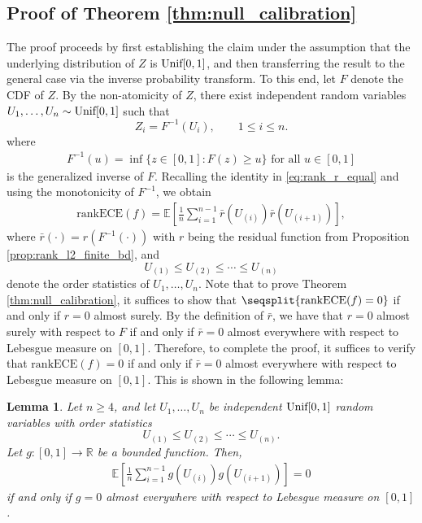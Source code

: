 \documentclass[11pt]{article}
\numberwithin{equation}{section}
\newtheorem{lemma}{Lemma}[section]
\theoremstyle{definition}
\newcommand{\E}{\mathbb{E}}
\newcommand{\R}{\mathbb{R}}
\newcommand{\ra}{\rightarrow}
\newcommand{\rankECE}{\mathrm{rankECE}}
\begin{document}
\subsection{Proof of Theorem \ref{thm:null_calibration}}\label{sec:proofof_thm_null_calibration}
The proof proceeds by first establishing the claim under the assumption that the underlying distribution of $Z$ is $\textnormal{Unif}[0,1]$, and then transferring the result to the general case via the inverse probability transform. To this end, let $F$ denote the CDF of $Z$. By the non-atomicity of $Z$, there exist independent random variables $U_1, \ldots, U_n \sim \textnormal{Unif}[0,1]$ such that
\[
    Z_i = F^{-1}(U_i), \qquad 1 \leq i \leq n.
\]
where
\begin{align*}
    F^{-1}(u) = \inf\{z\in[0,1]: F(z)\geq u\}\text{ for all }u\in [0,1]
\end{align*}
is the generalized inverse of $F$. Recalling the identity in \eqref{eq:rank_r_equal} and using the monotonicity of $F^{-1}$, we obtain
\begin{align}\label{eq:rank_uniform}
    \rankECE(f)
    =
    \E\left[\frac{1}{n}\sum_{i=1}^{n-1}\bar r(U_{(i)})\bar r(U_{(i+1)})\right],
\end{align}
where $\bar r(\cdot) = r(F^{-1}(\cdot))$ with $r$ being the residual function from Proposition \ref{prop:rank_l2_finite_bd}, and
\[
    U_{(1)} \leq U_{(2)} \leq \cdots \leq U_{(n)}
\]
denote the order statistics of $U_1, \ldots, U_n$. Note that to prove Theorem \ref{thm:null_calibration}, it suffices to show that $\seqsplit{\rankECE(f) = 0}$ if and only if $r = 0$ almost surely. By the definition of $\bar r$, we have that $r = 0$ almost surely with respect to $F$ if and only if $\bar r = 0$ almost everywhere with respect to Lebesgue measure on $[0,1]$. 
Therefore, to complete the proof, it suffices to verify that $\rankECE(f) = 0$ if and only if $\bar r = 0$ almost everywhere with respect to Lebesgue measure on $[0,1]$. This is shown in the following lemma:

\begin{lemma}\label{lemma:rank_uniform_0}
    Let $n \geq 4$, and let $U_1, \ldots, U_n$ be independent $\textnormal{Unif}[0,1]$ random variables with order statistics
    \[
        U_{(1)} \leq U_{(2)} \leq \cdots \leq U_{(n)}.
    \]
    Let $g:[0,1]\ra\R$ be a bounded function. Then,
    \begin{align*}
        \E\left[\frac{1}{n}\sum_{i=1}^{n-1}
        g\left(U_{(i)}\right)g\left(U_{(i+1)}\right)\right] = 0
    \end{align*}
    if and only if $g = 0$ almost everywhere with respect to Lebesgue measure on $[0,1]$.
\end{lemma}
\end{document}
